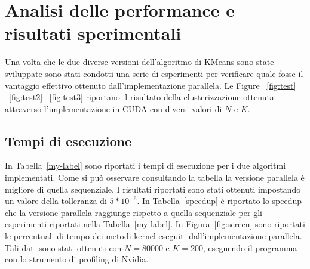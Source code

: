 \documentclass[10pt,twocolumn,letterpaper]{article}
\begin{document}
\section{Analisi delle performance e risultati sperimentali}
\label{sec:performanceanalysis}



Una volta che le due diverse versioni dell'algoritmo di KMeans sono state sviluppate sono stati condotti una serie di esperimenti per verificare quale fosse il vantaggio effettivo ottenuto dall'implementazione parallela.
Le Figure ~\ref{fig:test} ~\ref{fig:test2} ~\ref{fig:test3} riportano il risultato della clusterizzazione ottenuta attraverso l'implementazione in CUDA con diversi valori di $N$ e $K$.
\subsection{Tempi di esecuzione}
In Tabella~\ref{my-label} sono riportati i tempi di esecuzione per i due algoritmi implementati. Come si può osservare consultando la tabella la versione parallela è migliore di quella sequenziale. I risultati riportati sono stati ottenuti impostando un valore della tolleranza di  $5 * 10^{-6}$. In Tabella~\ref{speedup} è riportato lo speedup che la versione parallela raggiunge rispetto a quella sequenziale per gli esperimenti riportati nella Tabella~\ref{my-label}. In Figura~\ref{fig:screen} sono riportati le percentuali di tempo dei metodi kernel eseguiti dall'implementazione parallela. Tali dati sono stati ottenuti con $N=80000$ e $K=200$, eseguendo il programma con lo strumento di profiling di Nvidia.

\begin{table}[H]
\centering
\caption{Tempi di esecuzione}
\label{my-label}
\end{table}
\end{document}
